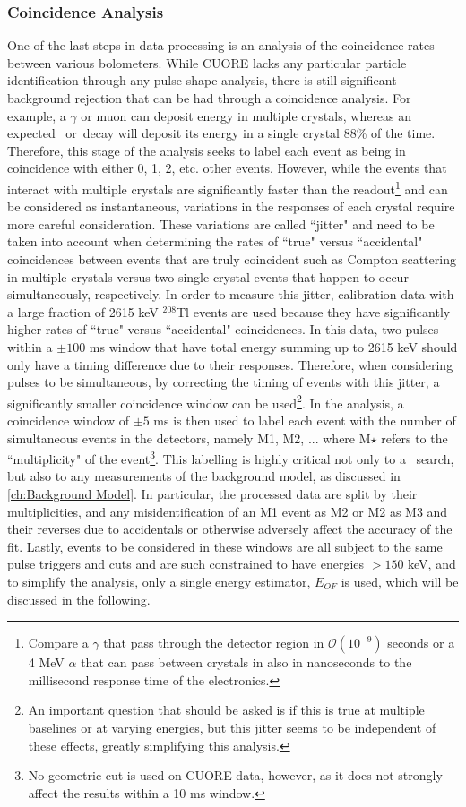 \subsubsection*{Coincidence Analysis}
One of the last steps in data processing is an analysis of the coincidence rates between various bolometers.
While CUORE lacks any particular particle identification through any pulse shape analysis, there is still significant background rejection that can be had through a coincidence analysis.
For example, a $\gamma$ or muon can deposit energy in multiple crystals, whereas an expected \zeronubb~or\twonubb~decay will deposit its energy in a single crystal 88\% of the time.
Therefore, this stage of the analysis seeks to label each event as being in coincidence with either 0, 1, 2, etc. other events.
However, while the events that interact with multiple crystals are significantly faster than the readout\footnote{Compare a $\gamma$ that pass through the detector region in $\mathcal{O}(10^{-9})$ seconds or a 4 MeV $\alpha$ that can pass between crystals in also in nanoseconds to the millisecond response time of the electronics.} and can be considered as instantaneous, variations in the responses of each crystal require more careful consideration.
These variations are called ``jitter" and need to be taken into account when determining the rates of ``true" versus ``accidental" coincidences between events that are truly coincident such as Compton scattering in multiple crystals versus two single-crystal events that happen to occur simultaneously, respectively.
In order to measure this jitter, calibration data with a large fraction of 2615 keV $^{208}$Tl events are used because they have significantly higher rates of ``true" versus ``accidental" coincidences.
In this data, two pulses within a $\pm100$ ms window that have total energy summing up to 2615 keV should only have a timing difference due to their responses.
Therefore, when considering pulses to be simultaneous, by correcting the timing of events with this jitter, a significantly smaller coincidence window can be used\footnote{An important question that should be asked is if this is true at multiple baselines or at varying energies, but this jitter seems to be independent of these effects, greatly simplifying this analysis.}.
In the analysis, a coincidence window of $\pm5$ ms is then used to label each event with the number of simultaneous events in the detectors, namely M1, M2, ... where M$\star$ refers to the ``multiplicity" of the event\footnote{No geometric cut is used on CUORE data, however, as it does not strongly affect the results within a 10 ms window.}.
This labelling is highly critical not only to a \zeronubb~search, but also to any measurements of the background model, as discussed in \autoref{ch:Background Model}.
In particular, the processed data are split by their multiplicities, and any misidentification of an M1 event as M2 or M2 as M3 and their reverses due to accidentals or otherwise adversely affect the accuracy of the fit. 
Lastly, events to be considered in these windows are all subject to the same pulse triggers and cuts and are such constrained to have energies $>150$ keV, and to simplify the analysis, only a single energy estimator, $E_{OF}$ is used, which will be discussed in the following.

